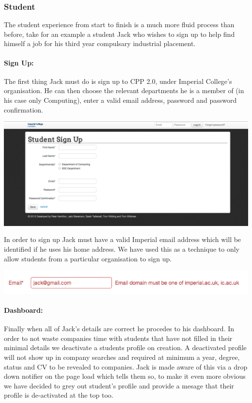 \subsubsection{Student}
The student experience from start to finish is a much more fluid process than before, take for an example a student Jack who wishes to sign up to help find himself a job for his third year compulsary industrial placement.
  \paragraph{Sign Up:}
    The first thing Jack must do is sign up to CPP 2.0, under Imperial College's organisation. He can then choose the relevant departments he is a member of (in his case only Computing), enter a valid email address, password and password confirmation.

    \includegraphics[scale=0.3]{images/user_experiences/student/sign_up_page}

    In order to sign up Jack must have a valid Imperial email address which will be identified if he uses his home address. We have used this as a technique to only allow students from a particular organisation to sign up.

    \includegraphics[scale=0.5]{images/user_experiences/student/invalid_email}

  \paragraph{Dashboard:}
    Finally when all of Jack's details are correct he procedes to his dashboard. In order to not waste companies time with students that have not filled in their minimal details we deactivate a students profile on creation. A deactivated profile will not show up in company searches and required at minimum a year, degree, status and CV to be revealed to companies. 
    Jack is made aware of this via a drop down notifier on the page load which tells them so, to make it even more obvious we have decided to grey out student's profile and provide a mesage that their profile is de-activated at the top too.


